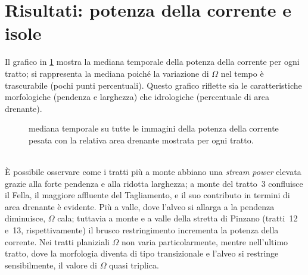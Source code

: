 \section{Risultati: potenza della corrente e isole}
Il grafico in \cref{graph:omega-perc-50} mostra la mediana temporale della potenza della corrente per ogni tratto; si rappresenta la mediana poiché la variazione di $\Omega$ nel tempo è trascurabile (pochi punti percentuali).
Questo grafico riflette sia le caratteristiche morfologiche (pendenza e larghezza) che idrologiche (percentuale di area drenante).
%
\begin{figure}
	\centering
	
	\caption[potenza della corrente in ogni tratto]{mediana temporale su tutte le immagini della potenza della corrente pesata con la relativa area drenante mostrata per ogni tratto.}
	\label{graph:omega-perc-50}
\end{figure}
%
\\
È possibile osservare come i tratti più a monte abbiano una \emph{stream power} elevata grazie alla forte pendenza e alla ridotta larghezza; a monte del tratto~3 confluisce il Fella, il maggiore affluente del Tagliamento, e il suo contributo in termini di area drenante è evidente.
Più a valle, dove l'alveo si allarga a la pendenza diminuisce, $\Omega$ cala; tuttavia a monte e a valle della stretta di Pinzano (tratti~12 e~13, rispettivamente) il brusco restringimento incrementa la potenza della corrente.
Nei tratti planiziali $\Omega$ non varia particolarmente, mentre nell'ultimo tratto, dove la morfologia diventa di tipo transizionale e l'alveo si restringe sensibilmente, il valore di $\Omega$ quasi triplica.


